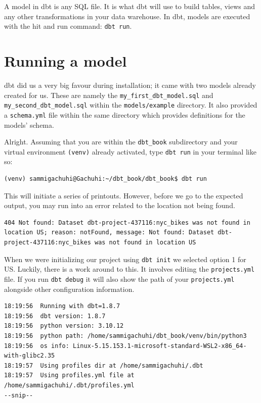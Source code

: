\documentclass[
]{book}
\begin{document}
A model in dbt is any SQL file. It is what dbt will use to build tables, views and any other transformations in your data warehouse. In dbt, models are executed with the hit and run command: \texttt{dbt\ run}.

\hypertarget{running-a-model}{%
\section{Running a model}\label{running-a-model}}

dbt did us a very big favour during installation; it came with two models already created for us. These are namely the \texttt{my\_first\_dbt\_model.sql} and \texttt{my\_second\_dbt\_model.sql} within the \texttt{models/example} directory. It also provided a \texttt{schema.yml} file within the same directory which provides definitions for the models' schema.

Alright. Assuming that you are within the \texttt{dbt\_book} subdirectory and your virtual environment \texttt{(venv)} already activated, type \texttt{dbt\ run} in your terminal like so:

\begin{verbatim}
(venv) sammigachuhi@Gachuhi:~/dbt_book/dbt_book$ dbt run
\end{verbatim}

This will initiate a series of printouts. However, before we go to the expected output, you may run into an error related to the location not being found.

\begin{verbatim}
404 Not found: Dataset dbt-project-437116:nyc_bikes was not found in location US; reason: notFound, message: Not found: Dataset dbt-project-437116:nyc_bikes was not found in location US
\end{verbatim}

When we were initializing our project using \texttt{dbt\ init} we selected option 1 for US. Luckily, there is a work around to this. It involves editing the \texttt{projects.yml} file. If you run \texttt{dbt\ debug} it will also show the path of your \texttt{projects.yml} alongside other configuration information.

\begin{verbatim}
18:19:56  Running with dbt=1.8.7
18:19:56  dbt version: 1.8.7
18:19:56  python version: 3.10.12
18:19:56  python path: /home/sammigachuhi/dbt_book/venv/bin/python3
18:19:56  os info: Linux-5.15.153.1-microsoft-standard-WSL2-x86_64-with-glibc2.35
18:19:57  Using profiles dir at /home/sammigachuhi/.dbt
18:19:57  Using profiles.yml file at /home/sammigachuhi/.dbt/profiles.yml
--snip--
\end{verbatim}
\end{document}
